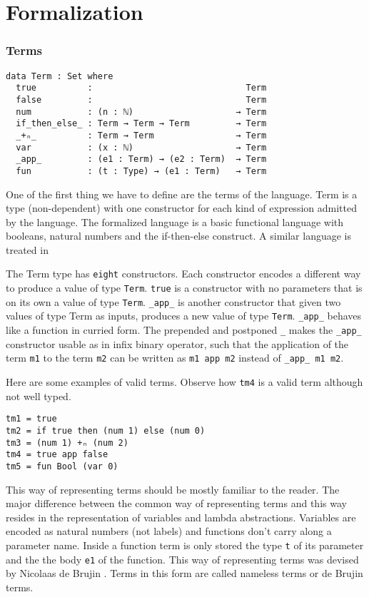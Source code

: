 \documentclass{article}
\begin{document}
\section{Formalization}

\subsubsection*{Terms}

\begin{verbatim}
data Term : Set where
  true          :                              Term
  false         :                              Term
  num           : (n : ℕ)                    → Term
  if_then_else_ : Term → Term → Term         → Term
  _+ₙ_          : Term → Term                → Term
  var           : (x : ℕ)                    → Term
  _app_         : (e1 : Term) → (e2 : Term)  → Term
  fun           : (t : Type) → (e1 : Term)   → Term
\end{verbatim}

One of the first thing we have to define are the terms of the language.
Term is a type (non-dependent) with one constructor for each kind of expression admitted by the language.
The formalized language is a basic functional language with booleans, natural numbers and the if-then-else construct.
A similar language is treated in \cite[Ch.\ 9]{pierce}

The Term type has \texttt{eight} constructors.
Each constructor encodes a different way to produce a value of type \texttt{Term}.
\texttt{true} is a constructor with no parameters that is on its own a value of type \texttt{Term}.
\texttt{\_app\_} is another constructor that given two values of type Term as inputs, produces a new value of type \texttt{Term}.
\texttt{\_app\_} behaves like a function in curried form.
The prepended and postponed \texttt{\_} makes the \texttt{\_app\_} constructor usable as in infix binary operator, such that the application of the term \texttt{m1} to the term \texttt{m2} can be written as \texttt{m1 app m2} instead of \texttt{\_app\_ m1 m2}.

Here are some examples of valid terms.
Observe how \texttt{tm4} is a valid term although not well typed.

\begin{verbatim}
tm1 = true
tm2 = if true then (num 1) else (num 0)
tm3 = (num 1) +ₙ (num 2)
tm4 = true app false
tm5 = fun Bool (var 0)
\end{verbatim}

This way of representing terms should be mostly familiar to the reader.
The major difference between the common way of representing terms and this way resides in the representation of variables and lambda abstractions.
Variables are encoded as natural numbers (not labels) and functions don't carry along a parameter name.
Inside a function term is only stored the type \texttt{t} of its parameter and the the body \texttt{e1} of the function.
This way of representing terms was devised by Nicolaas de Brujin \cite[Ch.\ 6]{pierce}.
Terms in this form are called nameless terms or de Brujin terms.
\end{document}
